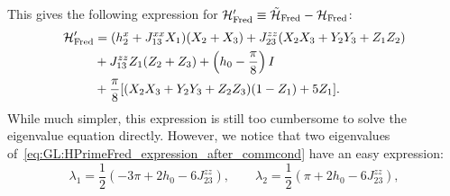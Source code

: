 This gives the following expression for ${\mathcal{H}}'_{\operatorname{Fred}}\equiv\tilde{{\mathcal{H}}}_{\operatorname{Fred}}-{\mathcal{H}}_{\operatorname{Fred}}$:
\begin{equation}
\begin{aligned}
    {\mathcal{H}}'_{\operatorname{Fred}} &=
    (h_2^x + J_{13}^{xx} X_1)(X_2+X_3)
    + J_{23}^{zz} (X_2 X_3 + Y_2 Y_3 + Z_1 Z_2) \\
    &+ J_{13}^{zz} Z_1 (Z_2 + Z_3)
    + \left(h_0 - \frac{\pi}{8}\right) I \\
    &+ \frac{\pi}{8} [
        (X_2 X_3 + Y_2 Y_3 + Z_2 Z_3) (1 - Z_1)
        + 5 Z_1
    ].
\end{aligned}
\label{eq:GL:HPrimeFred_expression_after_commcond}
\end{equation}
While much simpler, this expression is still too cumbersome to solve the eigenvalue equation directly.
However, we notice that two eigenvalues of~\cref{eq:GL:HPrimeFred_expression_after_commcond} have an easy expression:
\begin{equation}
    \lambda_1 = \frac{1}{2}( -3\pi + 2h_0 - 6J_{23}^{zz}),
    \qquad
    \lambda_2 = \frac{1}{2}( \pi   + 2h_0 - 6J_{23}^{zz}),
\label{eq:GL:fredkin_first_two_nice_eigenvalues}
\end{equation}

